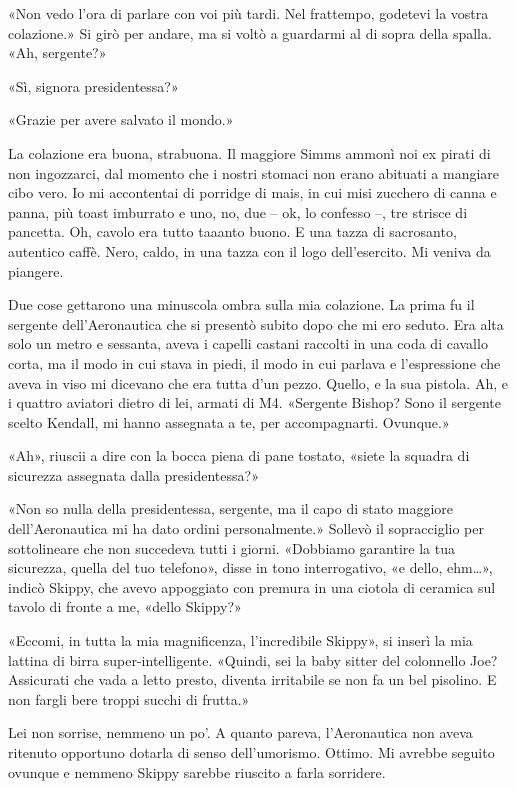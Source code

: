 «Non vedo l'ora di parlare con voi più tardi. Nel frattempo, godetevi la
vostra colazione.» Si girò per andare, ma si voltò a guardarmi al di
sopra della spalla. «Ah, sergente?»

«Sì, signora presidentessa?»

«Grazie per avere salvato il mondo.»

\hfill\break

La colazione era buona, strabuona. Il maggiore Simms ammonì noi ex
pirati di non ingozzarci, dal momento che i nostri stomaci non erano
abituati a mangiare cibo vero. Io mi accontentai di porridge di mais, in
cui misi zucchero di canna e panna, più toast imburrato e uno, no, due
-- ok, lo confesso --, tre strisce di pancetta. Oh, cavolo era tutto
taaanto buono. E una tazza di sacrosanto, autentico caffè. Nero, caldo,
in una tazza con il logo dell'esercito. Mi veniva da piangere.

Due cose gettarono una minuscola ombra sulla mia colazione. La prima fu
il sergente dell'Aeronautica che si presentò subito dopo che mi ero
seduto. Era alta solo un metro e sessanta, aveva i capelli castani
raccolti in una coda di cavallo corta, ma il modo in cui stava in piedi,
il modo in cui parlava e l'espressione che aveva in viso mi dicevano che
era tutta d'un pezzo. Quello, e la sua pistola. Ah, e i quattro aviatori
dietro di lei, armati di M4. «Sergente Bishop? Sono il sergente scelto
Kendall, mi hanno assegnata a te, per accompagnarti. Ovunque.»

«Ah», riuscii a dire con la bocca piena di pane tostato, «siete la
squadra di sicurezza assegnata dalla presidentessa?»

«Non so nulla della presidentessa, sergente, ma il capo di stato
maggiore dell'Aeronautica mi ha dato ordini personalmente.» Sollevò il
sopracciglio per sottolineare che non succedeva tutti i giorni.
«Dobbiamo garantire la tua sicurezza, quella del tuo telefono», disse in
tono interrogativo, «e dello, ehm\ldots», indicò Skippy, che avevo
appoggiato con premura in una ciotola di ceramica sul tavolo di fronte a
me, «dello Skippy?»

«Eccomi, in tutta la mia magnificenza, l'incredibile Skippy», si inserì
la mia lattina di birra super-intelligente. «Quindi, sei la baby sitter
del colonnello Joe? Assicurati che vada a letto presto, diventa
irritabile se non fa un bel pisolino. E non fargli bere troppi succhi di
frutta.»

Lei non sorrise, nemmeno un po'. A quanto pareva, l'Aeronautica non
aveva ritenuto opportuno dotarla di senso dell'umorismo. Ottimo. Mi
avrebbe seguito ovunque e nemmeno Skippy sarebbe riuscito a farla
sorridere.

